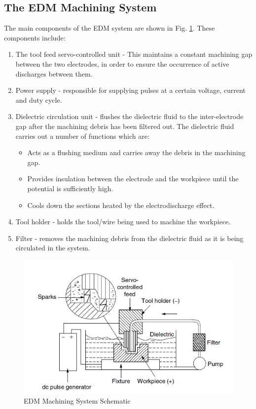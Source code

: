 \subsection{The EDM Machining System}
The main components of the EDM system are shown in Fig. \ref{fig:edm}. These components include:
\begin{enumerate}
	\item The tool feed servo-controlled unit - This maintains a constant machining gap between the two electrodes, in order to ensure the occurrence of active discharges between them.
	\item Power supply - responsible for  supplying pulses at a certain voltage, current and duty cycle.
	\item Dielectric circulation unit - flushes the dielectric fluid to the inter-electrode gap after the machining debris has been filtered out. The dielectric fluid carries out a number of functions which are:
	\begin{itemize}
		\item Acts as a flushing medium and carries away the debris in the machining gap.
		\item Provides insulation between the electrode and the workpiece until the potential is sufficiently high.
		\item Cools down the sections heated by the electrodischarge effect.
	\end{itemize}
	\item Tool holder - holds the tool/wire being used to machine the workpiece.
	\item Filter - removes the machining debris from the dielectric fluid as it is being circulated in the system.
\end{enumerate}
\begin{figure}[h!]
	\centering
	\includegraphics[width=0.7\linewidth]{Figures/edm}
	\caption{EDM Machining System Schematic}
	\label{fig:edm}
\end{figure}
